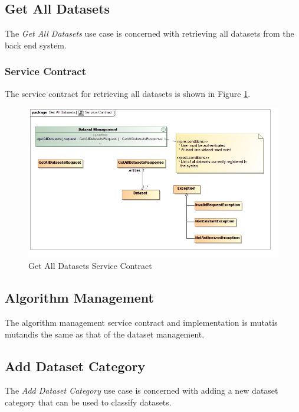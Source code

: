 \subsection {Get All Datasets}
The \textit{Get All Datasets} use case is concerned with retrieving all datasets
from the back end system.
\subsubsection{Service Contract}
The service contract for retrieving all datasets is shown in 
Figure \ref{fig:getAllDatasetsServiceContract}.
\begin{figure}[H]
  \begin{center}
  \includegraphics[scale=0.38]{../Diagrams and Charts/Repository Management/Get All Datasets Service Contract.jpg}
  \caption{Get All Datasets Service Contract}
  \label{fig:getAllDatasetsServiceContract}
  \end{center}
\end{figure}



\subsection{Algorithm Management}
The algorithm management service contract and implementation is mutatis mutandis
the same as that of the dataset management.



\subsection {Add Dataset Category}
The \textit{Add Dataset Category} use case is concerned with adding a new
dataset category that can be used to classify datasets. 

